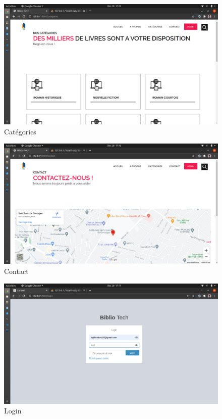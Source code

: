 \begin{figure}[h]
        \centering
        \includegraphics[width=1\textwidth]{categories}
        \caption{Catégories}
        \label{image-categories}
\end{figure}

\begin{figure}[h]
        \centering
        \includegraphics[width=1\textwidth]{contact}
        \caption{Contact}
        \label{image-contact}
\end{figure}

\begin{figure}[h]
        \centering
        \includegraphics[width=1\textwidth]{login}
        \caption{Login}
        \label{image-login}
\end{figure}

